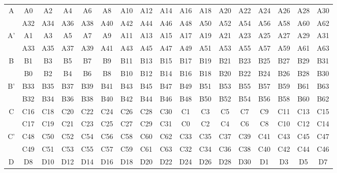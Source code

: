 \documentclass[a4paper, 10pt, conference]{ieeeconf}
\begin{document}
\begin{table}
\centering

\begin{threeparttable}
\centering
\begin{tabular}{|c||cccccccccccccccc|}
 \hline

  \multirow{2}{*}{A} & A0 & A2 & A4 & A6 & A8 & A10 & A12 & A14 & A16 & A18 & A20 & A22 & A24 & A26 & A28 & A30 \\  

   & A32 & A34 & A36 & A38 & A40 & A42 & A44 & A46 & A48 & A50 & A52 & A54 & A56 & A58 & A60 & A62 \\  
\hline
  \multirow{2}{*}{A'} & A1 & A3 & A5 & A7 & A9 & A11 & A13 & A15 & A17 & A19 & A21 & A23 & A25 & A27 & A29 & A31 \\  

   & A33 & A35 & A37 & A39 & A41 & A43 & A45 & A47 & A49 & A51 & A53 & A55 & A57 & A59 & A61 & A63 \\  
\hline
  \multirow{2}{*}{B} & B1 & B3 & B5 & B7 & B9 & B11 & B13 & B15 & B17 & B19 & B21 & B23 & B25 & B27 & B29 & B31 \\  

   & B0 & B2 & B4 & B6 & B8 & B10 & B12 & B14 & B16 & B18 & B20 & B22 & B24 & B26 & B28 & B30 \\  
\hline
  \multirow{2}{*}{B'} & B33 & B35 & B37 & B39 & B41 & B43 & B45 & B47 & B49 & B51 & B53 & B55 & B57 & B59 & B61 & B63 \\  

   & B32 & B34 & B36 & B38 & B40 & B42 & B44 & B46 & B48 & B50 & B52 & B54 & B56 & B58 & B60 & B62 \\  
\hline
  \multirow{2}{*}{C} & C16 & C18 & C20 & C22 & C24 & C26 & C28 & C30 & C1 & C3 & C5 & C7 & C9 & C11 & C13 & C15 \\  

   & C17 & C19 & C21 & C23 & C25 & C27 & C29 & C31 & C0 & C2 & C4 & C6 & C8 & C10 & C12 & C14 \\  
\hline
  \multirow{2}{*}{C'} & C48 & C50 & C52 & C54 & C56 & C58 & C60 & C62 & C33 & C35 & C37 & C39 & C41 & C43 & C45 & C47 \\  

   & C49 & C51 & C53 & C55 & C57 & C59 & C61 & C63 & C32 & C34 & C36 & C38 & C40 & C42 & C44 & C46 \\  
\hline
  \multirow{2}{*}{D} & D8 & D10 & D12 & D14 & D16 & D18 & D20 & D22 & D24 & D26 & D28 & D30 & D1 & D3 & D5 & D7 \\  


\end{tabular}
\end{threeparttable}
\end{table}
\end{document}
